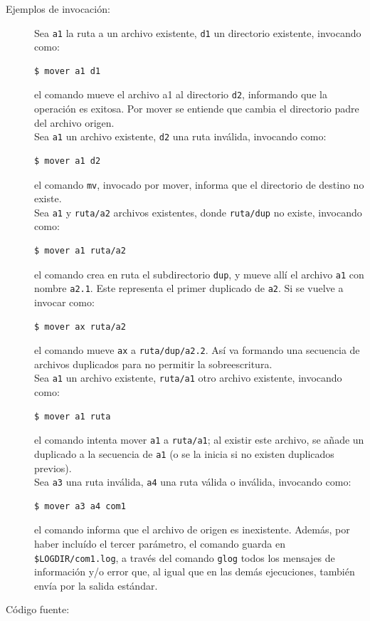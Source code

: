 \documentclass[12pt]{article}
\begin{document}
\begin{description}
	\item [Ejemplos de invocación:]
	Sea \verb|a1| la ruta a un archivo existente, \verb|d1| un directorio existente, invocando como:
	\begin{verbatim}$ mover a1 d1\end{verbatim}
	el comando mueve el archivo a1 al directorio \verb|d2|, informando que la operación es exitosa. Por mover se entiende que cambia el directorio padre del archivo origen.\\
	Sea \verb|a1| un archivo existente, \verb|d2| una ruta inválida, invocando como:
	\begin{verbatim}$ mover a1 d2\end{verbatim}
	el comando \verb|mv|, invocado por mover, informa que el directorio de destino no existe.\\
	Sea \verb|a1| y \verb|ruta/a2| archivos existentes, donde \verb|ruta/dup| no existe, invocando como:
	\begin{verbatim}$ mover a1 ruta/a2\end{verbatim}
	el comando crea en ruta el subdirectorio \verb|dup|, y mueve allí­ el archivo \verb|a1| con nombre \verb|a2.1|. Este representa el primer duplicado de \verb|a2|. Si se vuelve a invocar como:
	\begin{verbatim}$ mover ax ruta/a2\end{verbatim}
	el comando mueve \verb|ax| a \verb|ruta/dup/a2.2|. Así­ va formando una secuencia de archivos duplicados para no permitir la sobreescritura.\\
	Sea \verb|a1| un archivo existente, \verb|ruta/a1| otro archivo existente, invocando como:
	\begin{verbatim}$ mover a1 ruta\end{verbatim}
	el comando intenta mover \verb|a1| a \verb|ruta/a1|; al existir este archivo, se añade un duplicado a la secuencia de \verb|a1| (o se la inicia si no existen duplicados previos).\\
	Sea \verb|a3| una ruta inválida, \verb|a4| una ruta válida o inválida, invocando como:
	\begin{verbatim}$ mover a3 a4 com1\end{verbatim}
	el comando informa que el archivo de origen es inexistente. Además, por haber incluído el tercer parámetro, el comando guarda en \verb|$LOGDIR/com1.log|, a través del comando \verb|glog| todos los mensajes de información y/o error que, al igual que en las demás ejecuciones, también envía por la salida estándar.
	
	\item [Código fuente:]
\end{description}
{\footnotesize

}
\end{document}
